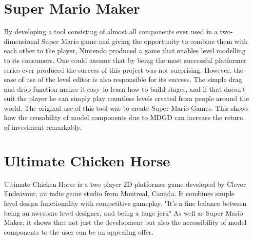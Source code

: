 \section{Super Mario Maker\cite{NIN}}
By developing a tool consisting of almost all components ever used in a two-dimensional Super Mario game and giving the opportunity to combine them with each other to the player, Nintendo produced a game that enables level modelling to its consumers. One could assume that by being the most successful platformer series ever produced the success of this project was not surprising. However, the ease of use of the level editor is also responsible for its success. The simple drag and drop function makes it easy to learn how to build stages, and if that doesn't suit the player he can simply play countless levels created from people around the world. The original use of this tool was to create Super Mario Games. This shows how the reusability of model components due to MDGD can increase the return of investment remarkably.

\section{Ultimate Chicken Horse\cite{CEG}}
Ultimate Chicken Horse is a two player 2D platformer game developed by Clever Endeavour, an indie game studio from Montreal, Canada. It combines simple level design functionality with competitive gameplay. "It's a fine balance between being an awesome level designer, and being a huge jerk"\cite{CEG}
As well as Super Mario Maker, it shows that not just the development but also the accessibility of model components to the user can be an appealing offer.